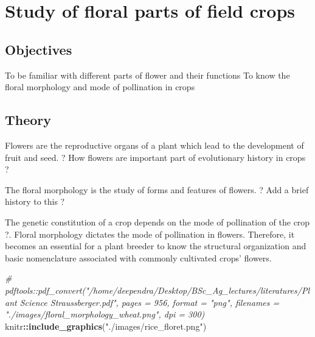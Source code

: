\documentclass[]{article}
\title{}
\author{}
\date{}
\newenvironment{Shaded}{\begin{snugshade}}{\end{snugshade}}
\newcommand{\CommentTok}[1]{\textcolor[rgb]{0.56,0.35,0.01}{\textit{#1}}}
\newcommand{\KeywordTok}[1]{\textcolor[rgb]{0.13,0.29,0.53}{\textbf{#1}}}
\newcommand{\NormalTok}[1]{#1}
\newcommand{\OperatorTok}[1]{\textcolor[rgb]{0.81,0.36,0.00}{\textbf{#1}}}
\newcommand{\StringTok}[1]{\textcolor[rgb]{0.31,0.60,0.02}{#1}}
\begin{document}
{
\setcounter{tocdepth}{2}
\tableofcontents
}
\hypertarget{practical-1}{%
\section{Study of floral parts of field crops}\label{practical-1}}

\hypertarget{objectives}{%
\subsection{Objectives}\label{objectives}}

To be familiar with different parts of flower and their functions
To know the floral morphology and mode of pollination in crops

\hypertarget{theory}{%
\subsection{Theory}\label{theory}}

Flowers are the reproductive organs of a plant which lead to the development of fruit and seed. ? How flowers are important part of evolutionary history in crops ?

The floral morphology is the study of forms and features of flowers. ? Add a brief history to this ?

The genetic constitution of a crop depends on the mode of pollination of the crop ?. Floral morphology dictates the mode of pollination in flowers. Therefore, it becomes an essential for a plant breeder to know the structural organization and basic nomenclature associated with commonly cultivated crops' flowers.

\begin{Shaded}
\begin{Highlighting}[]
\CommentTok{# pdftools::pdf_convert("/home/deependra/Desktop/BSc_Ag_lectures/literatures/Plant Science Straussberger.pdf", pages = 956, format = "png", filenames = "./images/floral_morphology_wheat.png", dpi = 300)}
\NormalTok{knitr}\OperatorTok{::}\KeywordTok{include_graphics}\NormalTok{(}\StringTok{"./images/rice_floret.png"}\NormalTok{)}
\end{Highlighting}
\end{Shaded}
\end{document}
